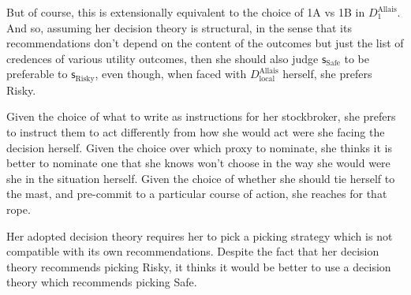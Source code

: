 \documentclass[a4paper]{article}
\newcommand\s{\mathsf{s}}
\renewcommand{\color}[1]{}
\newenvironment{colored}[1]{\leavevmode\color{#1}}{}
\newenvironment{CCM rewritten}
{\begingroup\color{blue}} %
{\endgroup}              %
\begin{document}
But of course, this is extensionally equivalent to the choice of 1A vs 1B in $D^{\mathrm{Allais}}_1$. And so, assuming her decision theory is structural, in the sense that its recommendations don't depend on the content of the outcomes but just the list of credences of various utility outcomes, then she should also judge $\s_{\mathrm{Safe}}$ to be preferable to $\s_{\mathrm{Risky}}$, even though, when faced with  $D^{\mathrm{Allais}}_{\mathrm{local}}$ herself, she prefers Risky.

Given the choice of what to write as instructions for her stockbroker, she prefers to instruct them to act differently from how she would act were she facing the decision herself. Given the choice over which proxy to nominate, she thinks it is better to nominate one that she knows won't choose in the way she would were she in the situation herself. 
Given the choice of whether she should tie herself to the mast, and pre-commit to a particular course of action, she reaches for that rope.%

Her adopted decision theory requires her to pick a picking strategy which is not compatible with its own recommendations. 
Despite the fact that her decision theory recommends picking Risky, it thinks it would be better to use a decision theory which recommends picking Safe.

\end{document}
